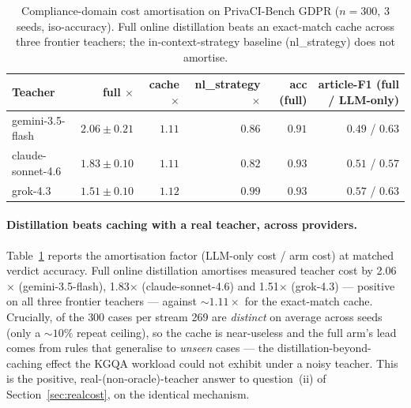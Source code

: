 \documentclass[11pt]{article}
\theoremstyle{plain}
\newcommand{\privFullGemini}{2.06}
\newcommand{\privCacheGemini}{1.11}
\newcommand{\privFullClaude}{1.83}
\newcommand{\privFullGrok}{1.51}
\newcommand{\privDistinct}{269}
\begin{document}
\begin{table}[t]\centering
\small
\caption{Compliance-domain cost amortisation on PrivaCI-Bench GDPR ($n{=}300$, 3 seeds, iso-accuracy). Full online distillation beats an exact-match cache across three frontier teachers; the in-context-strategy baseline (nl\_strategy) does not amortise.}
\label{tab:privaci}
\begin{tabular}{lrrrrr}
\toprule
Teacher & full $\times$ & cache $\times$ & nl\_strategy $\times$ & acc (full) & article-F1 (full / LLM-only) \\
\midrule
gemini-3.5-flash & $2.06\pm0.21$ & $1.11$ & $0.86$ & $0.91$ & $0.49$ / $0.63$ \\
claude-sonnet-4.6 & $1.83\pm0.10$ & $1.11$ & $0.82$ & $0.93$ & $0.51$ / $0.57$ \\
grok-4.3 & $1.51\pm0.10$ & $1.12$ & $0.99$ & $0.93$ & $0.57$ / $0.63$ \\
\bottomrule
\end{tabular}
\end{table}


\paragraph{Distillation beats caching with a real teacher, across providers.}
Table~\ref{tab:privaci} reports the amortisation factor (LLM-only cost /
arm cost) at matched verdict accuracy. Full online distillation amortises
measured teacher cost by \privFullGemini$\times$ (gemini-3.5-flash),
\privFullClaude$\times$ (claude-sonnet-4.6) and \privFullGrok$\times$
(grok-4.3) --- positive on all three frontier teachers --- against
${\sim}\privCacheGemini\times$ for the exact-match cache. Crucially, of the
$300$ cases per stream \privDistinct{} are \emph{distinct} on average across
seeds (only a ${\sim}10\%$ repeat ceiling), so the cache is near-useless and the full arm's
lead comes from rules that generalise to \emph{unseen} cases --- the
distillation-beyond-caching effect the KGQA workload could not exhibit under
a noisy teacher. This is the positive, real-(non-oracle)-teacher answer to
question~(ii) of Section~\ref{sec:realcost}, on the identical mechanism.
\end{document}
